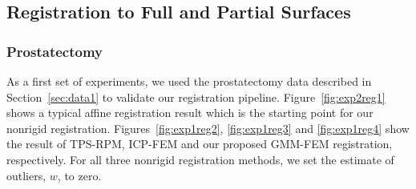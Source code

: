 \documentclass[journal]{IEEEtran}
\begin{document}
\subsection{Registration to Full and Partial Surfaces}\label{sec:exp1}
\subsubsection{Prostatectomy}
As a first set of experiments, we used the prostatectomy data described in Section~\ref{sec:data1} to validate our registration pipeline. Figure~\ref{fig:exp2reg1} shows a typical affine registration result which is the starting point for our nonrigid registration. Figures~\ref{fig:exp1reg2}, \ref{fig:exp1reg3} and \ref{fig:exp1reg4} show the result of TPS-RPM, ICP-FEM and our proposed GMM-FEM registration, respectively. For all three nonrigid registration methods, we set the estimate of outliers, $w$, to zero.
\end{document}
